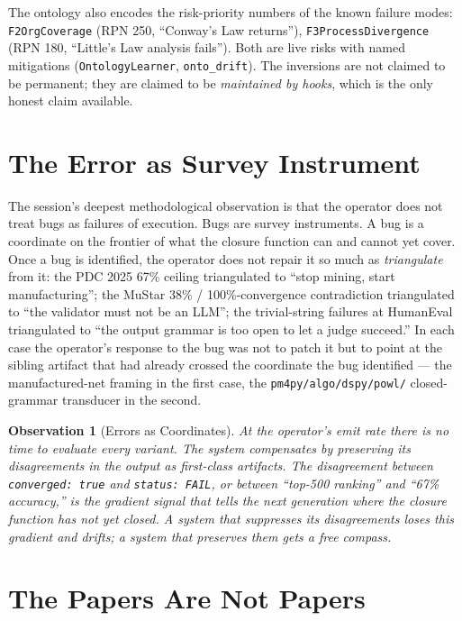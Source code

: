 \documentclass[11pt,letterpaper]{article}
\newtheorem{observation}{Observation}
\begin{document}
The ontology also encodes the risk-priority numbers of the known failure modes: \texttt{F2OrgCoverage} (RPN 250, ``Conway's Law returns''), \texttt{F3ProcessDivergence} (RPN 180, ``Little's Law analysis fails''). Both are live risks with named mitigations (\texttt{OntologyLearner}, \texttt{onto\_drift}). The inversions are not claimed to be permanent; they are claimed to be \emph{maintained by hooks}, which is the only honest claim available.

\section{The Error as Survey Instrument}

The session's deepest methodological observation is that the operator does not treat bugs as failures of execution. Bugs are survey instruments. A bug is a coordinate on the frontier of what the closure function can and cannot yet cover. Once a bug is identified, the operator does not repair it so much as \emph{triangulate} from it: the PDC 2025 67\% ceiling triangulated to ``stop mining, start manufacturing''; the MuStar 38\% / 100\%-convergence contradiction triangulated to ``the validator must not be an LLM''; the trivial-string failures at HumanEval triangulated to ``the output grammar is too open to let a judge succeed.'' In each case the operator's response to the bug was not to patch it but to point at the sibling artifact that had already crossed the coordinate the bug identified --- the manufactured-net framing in the first case, the \texttt{pm4py/algo/dspy/powl/} closed-grammar transducer in the second.

\begin{observation}[Errors as Coordinates]
At the operator's emit rate there is no time to evaluate every variant. The system compensates by \emph{preserving its disagreements in the output as first-class artifacts}. The disagreement between \texttt{converged: true} and \texttt{status: FAIL}, or between ``top-500 ranking'' and ``67\% accuracy,'' is the gradient signal that tells the next generation where the closure function has not yet closed. A system that suppresses its disagreements loses this gradient and drifts; a system that preserves them gets a free compass.
\end{observation}

\section{The Papers Are Not Papers}
\end{document}
